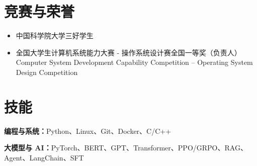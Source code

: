 \documentclass[10pt,a4paper]{article}
\begin{document}
\section{竞赛与荣誉}
\begin{itemize}
  \item 中国科学院大学三好学生
  \item 全国大学生计算机系统能力大赛 - 操作系统设计赛全国一等奖（负责人）\\
  \textcolor{muted}{Computer System Development Capability Competition -- Operating System Design Competition}
\end{itemize}

\section{技能}
\textbf{编程与系统：}Python、Linux、Git、Docker、C/C++\par
\textbf{大模型与 AI：}PyTorch、BERT、GPT、Transformer、PPO/GRPO、RAG、Agent、LangChain、SFT
\end{document}
